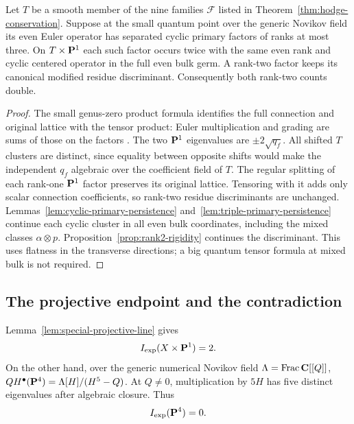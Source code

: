 \begin{lemma}
\label{lem:special-projective-line}%
Let $T$ be a smooth member of the nine families $\mathcal F$ listed in
Theorem~\ref{thm:hodge-conservation}. Suppose at
the small quantum point over the generic Novikov field its even
Euler operator has separated cyclic
primary factors of ranks at most three. On $T\times\mathbf P^1$ each such factor occurs twice with the
same even rank and cyclic centered operator in the full even bulk germ.
A rank-two factor keeps its canonical modified residue discriminant.
Consequently both rank-two counts double.
\end{lemma}
\begin{proof}
The small genus-zero product formula identifies the full connection and
original lattice with the tensor product: Euler multiplication and grading
are sums of those on the factors \cite[formula~(1)]{Behrend}.
The two $\mathbf P^1$ eigenvalues are $\pm2\sqrt{q_f}$. All shifted $T$ clusters
are distinct, since equality between opposite shifts would make the
independent $q_f$ algebraic over the coefficient field of $T$.
The regular splitting of each rank-one $\mathbf P^1$ factor preserves its original
lattice. Tensoring with it adds only scalar connection coefficients, so
rank-two residue discriminants are unchanged.
Lemmas~\ref{lem:cyclic-primary-persistence} and~\ref{lem:triple-primary-persistence} continue each cyclic cluster in
all even bulk coordinates, including the mixed classes $\alpha\otimes p$.
Proposition~\ref{prop:rank2-rigidity} continues the discriminant.
This uses flatness in the transverse directions; a big quantum tensor
formula at mixed bulk is not required.
%
%
\end{proof}

\subsection{The projective endpoint and the contradiction}

Lemma~\ref{lem:special-projective-line} gives
\begin{equation}
 I_{\mathrm{exp}}(X\times\mathbf P^1)=2.
 \label{eq:atomic-product-value}
\end{equation}
On the other hand, over the generic numerical Novikov field
\(\Lambda=\operatorname{Frac}\mathbf C[[Q]]\),
\(QH^\bullet(\mathbf P^4)=\Lambda[H]/(H^5-Q)\).  At \(Q\ne0\), multiplication
by \(5H\) has five distinct eigenvalues after algebraic closure.  Thus
\begin{equation}
 I_{\mathrm{exp}}(\mathbf P^4)=0.
 \label{eq:atomic-projective-value}
\end{equation}

